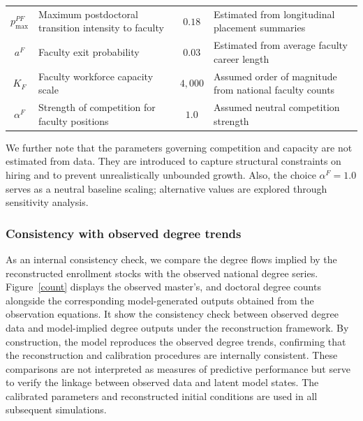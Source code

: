 \documentclass[3p]{elsarticle}%
\theoremstyle{definition}
\begin{document}
\begin{table}[H]
{\begin{tabular}{clcl}
$p^{PF}_{\max}$ 
& Maximum postdoctoral transition intensity to faculty 
& $0.18$ 
& Estimated from longitudinal placement summaries \cite{AMSworkforceReports} \\

$a^F$ 
& Faculty exit probability 
& $0.03$ 
& Estimated from average faculty career length \cite{AMSworkforceReports} \\

$K_F$ 
& Faculty workforce capacity scale 
& $4{,}000$ 
& Assumed order of magnitude from national faculty counts \cite{AMSworkforceReports} \\

$\alpha^F$ 
& Strength of competition for faculty positions 
& $1.0$ 
& Assumed neutral competition strength \\

\bottomrule   
				 \end{tabular}
            }
		
    \end{table}
 \noindent We further note that the parameters governing competition and capacity are not estimated from data. They are introduced to capture structural constraints on hiring and to prevent unrealistically unbounded growth. Also, the choice $\alpha^F=1.0$ serves as a neutral baseline scaling; alternative values are explored through sensitivity analysis.

\subsubsection{Consistency with observed degree trends}
 \noindent As an internal consistency check, we compare the degree flows implied by the reconstructed enrollment stocks with the observed national degree series. Figure~\ref{count} displays the observed master’s, and doctoral degree counts alongside the corresponding model-generated outputs obtained from the observation equations. It show the consistency check between observed degree data and model-implied degree outputs under the reconstruction framework. By construction, the model reproduces the observed degree trends, confirming that the reconstruction and calibration procedures are internally consistent. These comparisons are not interpreted as measures of predictive performance but serve to verify the linkage between observed data and latent model states. The calibrated parameters and reconstructed initial conditions are used in all subsequent simulations.
\end{document}
